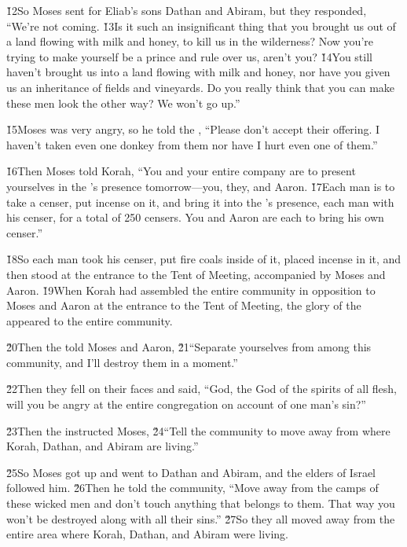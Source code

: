 \v{12}So Moses sent for Eliab's sons Dathan and Abiram, but they responded, ``We're not coming. \v{13}Is it such an insignificant thing that you brought us out of a land flowing with milk and honey, to kill us in the wilderness? Now you're trying to make yourself be a prince and rule over us, aren't you? \v{14}You still haven't brought us into a land flowing with milk and honey, nor have you given us an inheritance of fields and vineyards. Do you really think that you can make these men look the other way? We won't go up.''

\v{15}Moses was very angry, so he told the , ``Please don't accept their offering. I haven't taken even one donkey from them nor have I hurt even one of them.''

\v{16}Then Moses told Korah, ``You and your entire company are to present yourselves in the 's presence tomorrow---you, they, and Aaron. \v{17}Each man is to take a censer, put incense on it, and bring it into the 's presence, each man with his censer, for a total of 250 censers. You and Aaron are each to bring his own censer.''

\v{18}So each man took his censer, put fire coals inside of it, placed incense in it, and then stood at the entrance to the Tent of Meeting, accompanied by Moses and Aaron. \v{19}When Korah had assembled the entire community in opposition to Moses and Aaron at the entrance to the Tent of Meeting, the glory of the  appeared to the entire community.

\v{20}Then the  told Moses and Aaron, \v{21}``Separate yourselves from among this community, and I'll destroy them in a moment.''

\v{22}Then they fell on their faces and said, ``God, the God of the spirits of all flesh, will you be angry at the entire congregation on account of one man's sin?''

\v{23}Then the  instructed Moses, \v{24}``Tell the community to move away from where Korah, Dathan, and Abiram are living.''

\v{25}So Moses got up and went to Dathan and Abiram, and the elders of Israel followed him. \v{26}Then he told the community, ``Move away from the camps of these wicked men and don't touch anything that belongs to them. That way you won't be destroyed along with all their sins.'' \v{27}So they all moved away from the entire area where Korah, Dathan, and Abiram were living.

